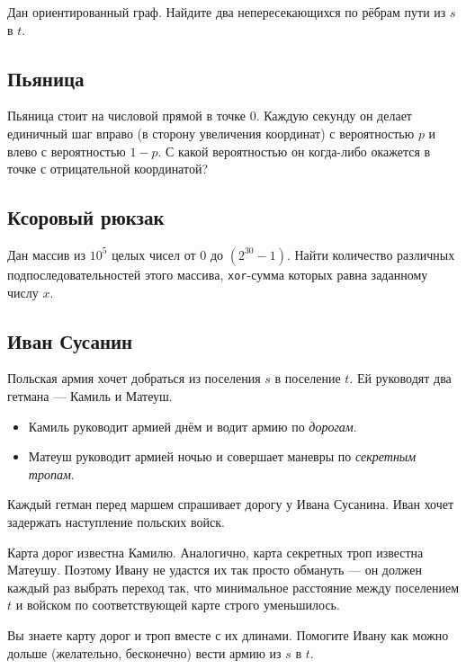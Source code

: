 \documentclass[11pt]{article}
\providecommand{\tightlist}{%
      \setlength{\itemsep}{0pt}\setlength{\parskip}{0pt}}
\begin{document}
Дан ориентированный граф. Найдите два непересекающихся по рёбрам пути из
\(s\) в \(t\).

    \subsection{Пьяница}\label{ux43fux44cux44fux43dux438ux446ux430}

Пьяница стоит на числовой прямой в точке 0. Каждую секунду он делает
единичный шаг вправо (в сторону увеличения координат) с вероятностью
\(p\) и влево с вероятностью \(1-p\). С какой вероятностью он когда-либо
окажется в точке с отрицательной координатой?

    \subsection{Ксоровый
рюкзак}\label{ux43aux441ux43eux440ux43eux432ux44bux439-ux440ux44eux43aux437ux430ux43a}

Дан массив из \(10^5\) целых чисел от \(0\) до \((2^{30}-1)\). Найти
количество различных подпоследовательностей этого массива,
\texttt{xor}-сумма которых равна заданному числу \(x\).

    \subsection{Иван
Сусанин}\label{ux438ux432ux430ux43d-ux441ux443ux441ux430ux43dux438ux43d}

Польская армия хочет добраться из поселения \(s\) в поселение \(t\). Ей
руководят два гетмана --- Камиль и Матеуш.

\begin{itemize}
\tightlist
\item
  Камиль руководит армией днём и водит армию по \emph{дорогам}.
\item
  Матеуш руководит армией ночью и совершает маневры по \emph{секретным
  тропам}.
\end{itemize}

Каждый гетман перед маршем спрашивает дорогу у Ивана Сусанина. Иван
хочет задержать наступление польских войск.

Карта дорог известна Камилю. Аналогично, карта секретных троп известна
Матеушу. Поэтому Ивану не удастся их так просто обмануть --- он должен
каждый раз выбрать переход так, что минимальное расстояние между
поселением \(t\) и войском по соответствующей карте строго уменьшилось.

Вы знаете карту дорог и троп вместе с их длинами. Помогите Ивану как
можно дольше (желательно, бесконечно) вести армию из \(s\) в \(t\).
\end{document}

